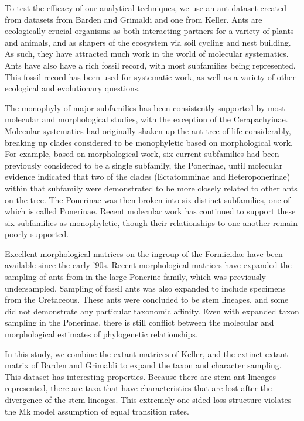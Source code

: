\documentclass[]{article}
\begin{document}
To test the efficacy of our analytical techniques, we use an ant dataset created from datasets from Barden and Grimaldi and one from Keller.
Ants are ecologically crucial organisms as both interacting partners for a variety of plants and animals, and as shapers of the ecosystem via soil cycling and nest building.
As such, they have attracted much work in the world of molecular systematics.
Ants have also have a rich fossil record, with most subfamilies being represented. 
This fossil record has been used for systematic work, as well as a variety of other ecological and evolutionary questions.\par
The monophyly of major subfamilies has been consistently supported by most molecular and morphological studies, with the exception of the Cerapachyinae. 
Molecular systematics had originally shaken up the ant tree of life considerably, breaking up clades considered to be monophyletic based on morphological work.
For example, based on morphological work, six current subfamilies had been previously considered to be a single subfamily, the Ponerinae, until molecular evidence indicated that two of the clades (Ectatomminae and Heteroponerinae) within that subfamily were demonstrated to be more closely related to other ants on the tree.
The Ponerinae was then broken into six distinct subfamilies, one of which is called Ponerinae. 
Recent molecular work has continued to support these six subfamilies as monophyletic, though their relationships to one another remain poorly supported. \par
Excellent morphological matrices on the ingroup of the Formicidae have been available since the early '90s. 
Recent morphological matrices have expanded the sampling of ants from in the large Ponerine family, which was previously undersampled.
Sampling of fossil ants was also expanded to include specimens from the Cretaceous.
These ants were concluded to be stem lineages, and some did not demonstrate any particular taxonomic affinity. 
Even with expanded taxon sampling in the Ponerinae, there is still conflict between the molecular and morphological estimates of phylogenetic relationships. \par
In this study, we combine the extant matrices of Keller, and the extinct-extant matrix of Barden and Grimaldi to expand the taxon and character sampling.  
This dataset has interesting properties.
Because there are stem ant lineages represented, there are taxa that have characteristics that are lost after the divergence of the stem lineages.
This extremely one-sided loss structure violates the Mk model assumption of equal transition rates. 
\end{document}
